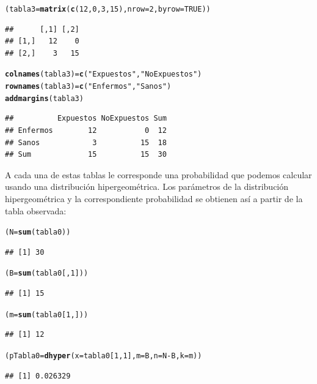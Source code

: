 \documentclass[10pt,a4paper]{article}\usepackage[]{graphicx}\usepackage[]{color}
\makeatletter
\newcommand{\hlnum}[1]{\textcolor[rgb]{0.686,0.059,0.569}{#1}}%
\newcommand{\hlstr}[1]{\textcolor[rgb]{0.192,0.494,0.8}{#1}}%
\newcommand{\hlopt}[1]{\textcolor[rgb]{0,0,0}{#1}}%
\newcommand{\hlstd}[1]{\textcolor[rgb]{0.345,0.345,0.345}{#1}}%
\newcommand{\hlkwb}[1]{\textcolor[rgb]{0.69,0.353,0.396}{#1}}%
\newcommand{\hlkwc}[1]{\textcolor[rgb]{0.333,0.667,0.333}{#1}}%
\newcommand{\hlkwd}[1]{\textcolor[rgb]{0.737,0.353,0.396}{\textbf{#1}}}%
\newenvironment{kframe}{%
 \def\at@end@of@kframe{}%
 \ifinner\ifhmode%
  \def\at@end@of@kframe{\end{minipage}}%
  \begin{minipage}{\columnwidth}%
 \fi\fi%
 \def\FrameCommand##1{\hskip\@totalleftmargin \hskip-\fboxsep
 \colorbox{shadecolor}{##1}\hskip-\fboxsep
     \hskip-\linewidth \hskip-\@totalleftmargin \hskip\columnwidth}%
 \MakeFramed {\advance\hsize-\width
   \@totalleftmargin\z@ \linewidth\hsize
   \@setminipage}}%
 {\par\unskip\endMakeFramed%
 \at@end@of@kframe}
\newenvironment{knitrout}{}{} %
\makeatother
\begin{document}
\begin{knitrout}
\begin{kframe}
\begin{alltt}
\hlstd{(tabla3} \hlkwb{=} \hlkwd{matrix}\hlstd{(} \hlkwd{c}\hlstd{(}\hlnum{12}\hlstd{,} \hlnum{0}\hlstd{,} \hlnum{3}\hlstd{,} \hlnum{15}\hlstd{),}  \hlkwc{nrow}\hlstd{=} \hlnum{2}\hlstd{,} \hlkwc{byrow} \hlstd{=} \hlnum{TRUE}\hlstd{))}
\end{alltt}
\begin{verbatim}
##      [,1] [,2]
## [1,]   12    0
## [2,]    3   15
\end{verbatim}
\begin{alltt}
\hlkwd{colnames}\hlstd{(tabla3)} \hlkwb{=} \hlkwd{c}\hlstd{(}\hlstr{"Expuestos"}\hlstd{,} \hlstr{"NoExpuestos"}\hlstd{)}
\hlkwd{rownames}\hlstd{(tabla3)} \hlkwb{=} \hlkwd{c}\hlstd{(}\hlstr{"Enfermos"}\hlstd{,} \hlstr{"Sanos"} \hlstd{)}
\hlkwd{addmargins}\hlstd{(tabla3)}
\end{alltt}
\begin{verbatim}
##          Expuestos NoExpuestos Sum
## Enfermos        12           0  12
## Sanos            3          15  18
## Sum             15          15  30
\end{verbatim}
\end{kframe}
\end{knitrout}

A cada una de estas tablas le corresponde una probabilidad que podemos calcular usando una distribución hipergeométrica. Los parámetros de la distribución hipergeométrica y la correspondiente probabilidad se obtienen así a partir de la tabla observada:
\begin{knitrout}
\color{fgcolor}\begin{kframe}
\begin{alltt}
\hlstd{(N} \hlkwb{=} \hlkwd{sum}\hlstd{(tabla0))}
\end{alltt}
\begin{verbatim}
## [1] 30
\end{verbatim}
\begin{alltt}
\hlstd{(B} \hlkwb{=} \hlkwd{sum}\hlstd{(tabla0[,}\hlnum{1}\hlstd{]))}
\end{alltt}
\begin{verbatim}
## [1] 15
\end{verbatim}
\begin{alltt}
\hlstd{(m} \hlkwb{=} \hlkwd{sum}\hlstd{(tabla0[}\hlnum{1}\hlstd{, ]))}
\end{alltt}
\begin{verbatim}
## [1] 12
\end{verbatim}
\begin{alltt}
\hlstd{(pTabla0} \hlkwb{=} \hlkwd{dhyper}\hlstd{(}\hlkwc{x}\hlstd{=tabla0[}\hlnum{1}\hlstd{,}\hlnum{1}\hlstd{],} \hlkwc{m} \hlstd{= B,} \hlkwc{n} \hlstd{= N} \hlopt{-} \hlstd{B,} \hlkwc{k} \hlstd{= m))}
\end{alltt}
\begin{verbatim}
## [1] 0.026329
\end{verbatim}
\end{kframe}
\end{knitrout}
\end{document}
